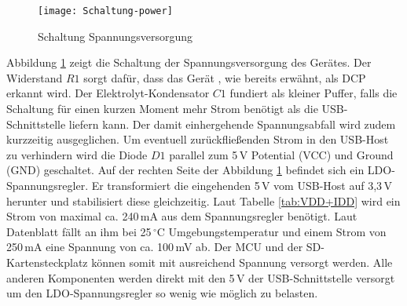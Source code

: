 \begin{figure}[h]
	\begin{center}
		\texttt{[image: Schaltung-power]}	
		\caption{Schaltung Spannungsversorgung}
		\label{fig:Schaltung-power}
	\end{center}
\end{figure}
Abbildung \ref{fig:Schaltung-power} zeigt die Schaltung der Spannungsversorgung des Gerätes. Der Widerstand $R1$ sorgt dafür, dass das Gerät , wie bereits erwähnt, als DCP erkannt wird. Der Elektrolyt-Kondensator $C1$ fundiert als kleiner Puffer, falls die Schaltung für einen kurzen Moment mehr Strom benötigt als die USB-Schnittstelle liefern kann. Der damit einhergehende Spannungsabfall wird zudem kurzzeitig ausgeglichen. Um eventuell zurückfließenden Strom in den USB-Host zu verhindern wird die Diode $D1$ parallel zum 5\,V Potential (VCC) und Ground (GND) geschaltet. Auf der rechten Seite der Abbildung \ref{fig:Schaltung-power} befindet sich ein LDO-Spannungsregler. Er transformiert die eingehenden 5\,V vom USB-Host auf 3,3\,V herunter und stabilisiert diese gleichzeitig. Laut Tabelle \ref{tab:VDD+IDD} wird ein Strom von maximal ca. 240\,mA aus dem Spannungsregler benötigt. Laut Datenblatt fällt an ihm bei 25\,$^{\circ}$C Umgebungstemperatur und einem Strom von 250\,mA eine Spannung von ca. 100\,mV ab. Der MCU und der SD-Kartensteckplatz können somit mit ausreichend Spannung versorgt werden. Alle anderen Komponenten werden direkt mit den 5\,V der USB-Schnittstelle versorgt um den LDO-Spannungsregler so wenig wie möglich zu belasten.